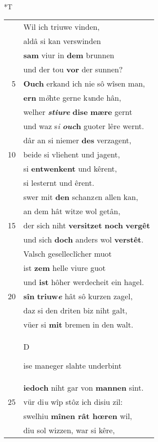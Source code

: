 \documentclass[8pt,a4paper,notitlepage]{article}
\begin{document}
\begin{table}[ht]
\begin{minipage}[t]{0.5\linewidth}
\small
\begin{center}*T
\end{center}
\begin{tabular}{rl}
 & Wil ich triuwe vinden,\\ 
 & aldâ si kan verswinden\\ 
 & \textbf{sam} viur in \textbf{dem} brunnen\\ 
 & und der tou \textbf{vor} der sunnen?\\ 
5 & \textbf{Ouch} erkand ich nie sô wîsen man,\\ 
 & \textbf{er}\textbf{n} m\textit{ö}hte gerne k\textit{u}nde hân,\\ 
 & welher \textit{\textbf{stiure}} \textbf{dise} \textbf{mære} gernt\\ 
 & und waz s\textit{i} \textbf{\textit{ouc}h} guoter lêre wernt.\\ 
 & dâr an si niemer \textbf{des} verzagent,\\ 
10 & beide si vliehent und jagent,\\ 
 & si \textbf{entwenkent} und kêrent,\\ 
 & si lesternt und êrent.\\ 
 & swer mit \textbf{den} schanz\textit{e}n allen kan,\\ 
 & an dem hât witze wol getân,\\ 
15 & der sich niht \textbf{versitzet} \textbf{noch} \textbf{vergêt}\\ 
 & und sich \textbf{doch} anders wol \textbf{verstêt}.\\ 
 & Valsch geselleclîcher muot\\ 
 & ist \textbf{z}\textbf{em} helle viure guot\\ 
 & und \textbf{ist} hôher werdecheit ein hagel.\\ 
20 & \textbf{sîn} \textbf{triuw\textit{e}} hât sô kurzen zagel,\\ 
 & daz si den driten biz niht galt,\\ 
 & vüer si \textbf{mit} bremen in den walt.\\ 
 & \begin{large}D\end{large}ise maneger slahte underbint\\ 
 & \textbf{iedoch} niht gar von \textbf{mannen} sint.\\ 
25 & vür di\textit{u} wîp stôz ich disiu zil:\\ 
 & swelhiu \textbf{mînen rât hœren} wil,\\ 
 & diu sol wizzen, war si kêre,\\ 

\end{tabular}
\end{minipage}
\end{table}
\end{document}
